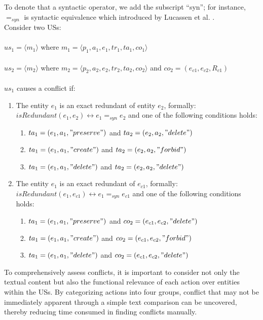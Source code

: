 \begin{definition}
\begin{itemize}
	\end{itemize}
	To denote that a syntactic operator, we add the subscript
	“syn”; for instance, $=_{syn}$ is syntactic equivalence which introduced by Lucassen et al. \cite{lucassen2016improving}.\\ Consider two USs:\\\\ $us_1 = \langle m_1\rangle $ where $m_1 = \langle p_1,a_1,e_1,tr_1,ta_1,co_1 \rangle$ \\\\$us_2 = \langle m_2\rangle$ where $m_2 = \langle p_2,a_2,e_2,tr_2,ta_2,co_2 \rangle$ and $co_2 = (e_{c1},e_{c2},R_{c1})$\\\\
	$us_1$ causes a conflict if:
	\begin{enumerate}
		\item The entity $e_1$ is an exact redundant of entity $e_2$, formally:\\ $isRedundant(e_1,e_2) \leftrightarrow e_1 =_{syn} e_2$ and one of the following conditions holds:\\
		\begin{enumerate}
			\item $ta_1 = (e_1,a_1,"preserve")$ and $ta_2 = (e_2,a_2,"delete")$
			
			\item $ta_1 = (e_1,a_1,"create")$ and $ta_2 = (e_2,a_2,"forbid")$
			
			\item $ta_1 = (e_1,a_1,"delete")$ and $ta_2 = (e_2,a_2,"delete")$
		\end{enumerate}
		
		\item The entity $e_1$ is an exact redundant of  $e_{c1}$, formally:\\ $isRedundant(e_1,e_{c1}) \leftrightarrow e_1 =_{syn} e_{c1}$ and one of the following conditions holds:\\
		\begin{enumerate}
			\item $ta_1 = (e_1,a_1,"preserve")$ and $co_2 = (e_{c1},e_{c2},"delete")$
			
			\item $ta_1 = (e_1,a_1,"create")$ and $co_2 = (e_{c1},e_{c2},"forbid")$
			
			\item $ta_1 = (e_1,a_1,"delete")$ and $co_2 = (e_{c1},e_{c2},"delete")$
		\end{enumerate}
	\end{enumerate}
	 
	To comprehensively assess conflicts, it is important to consider not only the textual content but also the functional relevance of each action over entities within the USs. By categorizing actions into four groups, conflict that may not be immediately apparent through a simple text comparison can be uncovered, thereby reducing time consumed in finding conflicts manually.
\end{definition}	
